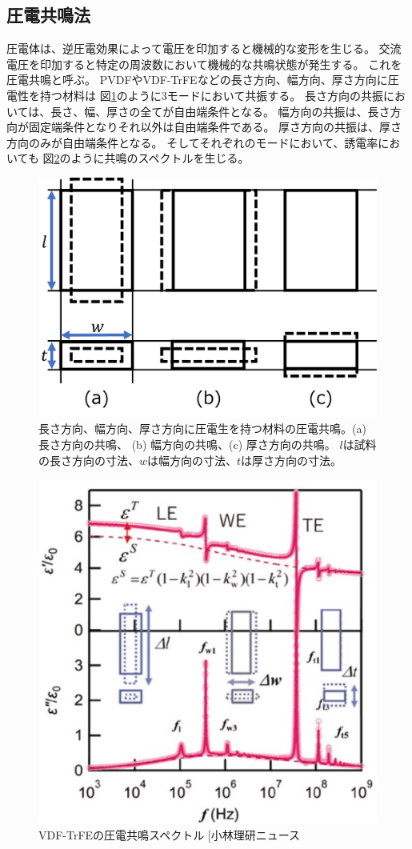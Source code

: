 \documentclass[dvipdfmx,12pt,a4paper]{jreport}
\makeatletter
\DeclareRobustCommand\cite{\unskip
    	\@ifnextchar[{\@tempswatrue\@citex}{\@tempswafalse\@citex[]}}
\makeatother
\begin{document}
			\subsection{圧電共鳴法}
			圧電体は、逆圧電効果によって電圧を印加すると機械的な変形を生じる。
			交流電圧を印加すると特定の周波数において機械的な共鳴状態が発生する。
			これを圧電共鳴と呼ぶ。
			PVDFやVDF-TrFEなどの長さ方向、幅方向、厚さ方向に圧電性を持つ材料は
			図\ref{圧電共鳴のモード}のように3モードにおいて共振する。
			長さ方向の共振においては、長さ、幅、厚さの全てが自由端条件となる。
			幅方向の共振は、長さ方向が固定端条件となりそれ以外は自由端条件である。
			厚さ方向の共振は、厚さ方向のみが自由端条件となる。
			そしてそれぞれのモードにおいて、誘電率においても
			図\ref{VDF-TrFEの圧電共鳴スペクトル}のように共鳴のスペクトルを生じる。
			\begin{figure}[h]
				\centering
				\includegraphics[width=0.6\linewidth]{圧電共鳴.jpg}
				\caption{長さ方向、幅方向、厚さ方向に圧電生を持つ材料の圧電共鳴。(a) 長さ方向の共鳴、
				(b) 幅方向の共鳴、(c) 厚さ方向の共鳴。
				$l$は試料の長さ方向の寸法、$w$は幅方向の寸法、$t$は厚さ方向の寸法。}
				\label{圧電共鳴のモード}
			\end{figure}
			\begin{figure}[h]
				\centering
				\includegraphics[width=0.5\linewidth]{VDF_TrFe_圧電共鳴.jpg}
				\caption{VDF-TrFEの圧電共鳴スペクトル\cite{小林理研ニュース}}
				\label{VDF-TrFEの圧電共鳴スペクトル}
			\end{figure}
\end{document}
